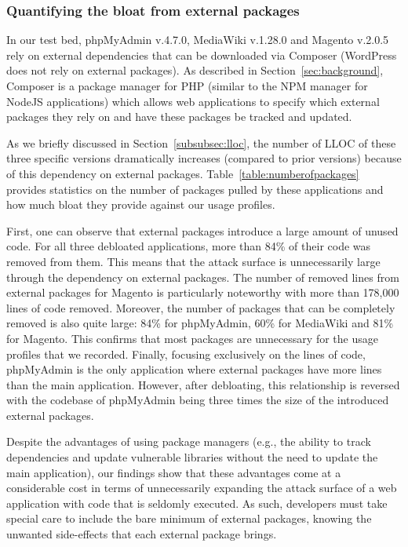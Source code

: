 \subsubsection{Quantifying the bloat from external packages}

In our test bed, phpMyAdmin v.4.7.0, MediaWiki v.1.28.0 and Magento v.2.0.5 rely
on external dependencies that can be downloaded via Composer (WordPress does not rely on external packages). As described in
Section~\ref{sec:background}, Composer is a package manager for PHP (similar
to the NPM manager for NodeJS applications) which allows web applications
to specify which external packages they rely on and have these packages be
tracked and updated.

As we briefly discussed in Section~\ref{subsubsec:lloc}, the number of LLOC of
these three specific versions dramatically
increases (compared to prior versions) because of this dependency on external
packages. Table~\ref{table:numberofpackages} provides statistics on the
number of packages pulled by these applications and how much bloat they
provide against our usage profiles.


First, one can observe that external packages introduce a large amount of
unused code. For all three debloated applications, more than 84\% of their code
was removed from them. This means that the attack surface is unnecessarily
large through the dependency on external packages. The number of removed
lines from external packages for Magento is particularly noteworthy with
more than 178,000 lines of code removed. Moreover, the number of packages
that can be completely removed is also quite large: 84\% for phpMyAdmin,
60\% for MediaWiki and 81\% for Magento. This confirms that most packages
are unnecessary for the usage profiles that we recorded. Finally, focusing
exclusively on the lines of code, phpMyAdmin is the only application where
external packages have more lines than the main application. However, after
debloating, this relationship is reversed with the codebase of phpMyAdmin
being three times the size of the introduced external packages.


Despite the advantages of using package managers (e.g., the ability to track
dependencies and update vulnerable libraries without the need to update
the main application), our findings show that these advantages come at a
considerable cost in terms of unnecessarily expanding the attack surface of
a web application with code that is seldomly executed. As such, developers
must take special care to include the bare minimum of external packages,
knowing the unwanted side-effects that each external package brings.

